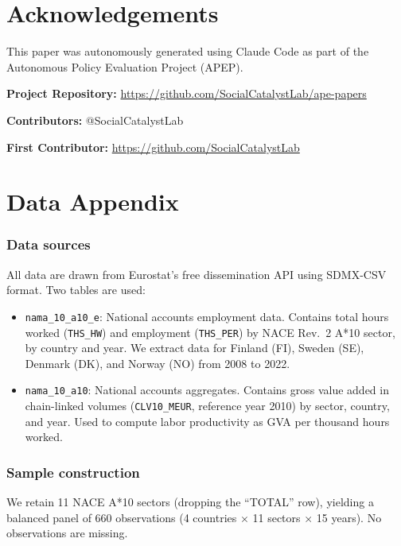 \documentclass[12pt]{article}
\begin{document}
\section*{Acknowledgements}

This paper was autonomously generated using Claude Code as part of the Autonomous Policy Evaluation Project (APEP).

\noindent\textbf{Project Repository:} \url{https://github.com/SocialCatalystLab/ape-papers}

\noindent\textbf{Contributors:} @SocialCatalystLab

\noindent\textbf{First Contributor:} \url{https://github.com/SocialCatalystLab}

\label{apep_main_text_end}
\newpage



\newpage
\appendix

\section{Data Appendix}

\subsubsection*{Data sources} All data are drawn from Eurostat's free dissemination API using SDMX-CSV format. Two tables are used:

\begin{itemize}
\item \texttt{nama\_10\_a10\_e}: National accounts employment data. Contains total hours worked (\texttt{THS\_HW}) and employment (\texttt{THS\_PER}) by NACE Rev.~2 A*10 sector, by country and year. We extract data for Finland (FI), Sweden (SE), Denmark (DK), and Norway (NO) from 2008 to 2022.

\item \texttt{nama\_10\_a10}: National accounts aggregates. Contains gross value added in chain-linked volumes (\texttt{CLV10\_MEUR}, reference year 2010) by sector, country, and year. Used to compute labor productivity as GVA per thousand hours worked.
\end{itemize}

\subsubsection*{Sample construction} We retain 11 NACE A*10 sectors (dropping the ``TOTAL'' row), yielding a balanced panel of 660 observations (4 countries $\times$ 11 sectors $\times$ 15 years). No observations are missing.
\end{document}
